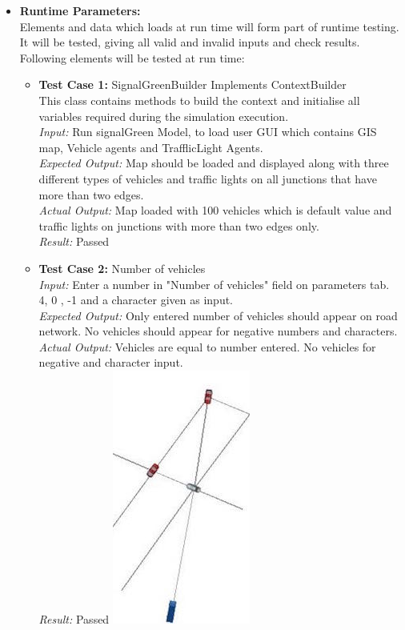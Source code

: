 \documentclass[11pt, oneside]{article}   	%
\begin{document}
\begin{itemize}
\begin{enumerate}
 \end{enumerate}
\item \textbf{Runtime Parameters:} \hfill \\
Elements and data which loads at run time will form part of runtime testing. It will be tested, giving all valid and invalid inputs and check results. Following elements will be tested at run time:
\begin{itemize}
\item \textbf{Test Case 1:} SignalGreenBuilder Implements ContextBuilder\hfill \\
This class contains methods to build the context and initialise all variables required during the simulation execution.\hfil \\
\textit{Input:} Run signalGreen Model, to load user GUI which contains GIS map, Vehicle agents and TrafflicLight Agents.\hfill \\
\textit{Expected Output:} Map should be loaded and displayed along with three different types of vehicles and traffic lights on all junctions that have more than two edges.\hfill \\
\textit{Actual Output:} Map loaded with 100 vehicles which is default value and traffic lights on junctions with more than two edges only.\hfill \\
\textit{Result:} Passed
\item\textbf{Test Case 2:} Number of vehicles\hfill \\
\textit{Input:} Enter a number in "Number of vehicles" field on parameters tab.\hfill \\
4, 0 , -1 and a character given as input.\hfill \\
\textit{Expected Output:} Only entered number of vehicles should appear on road network. No vehicles should appear for negative numbers and characters. \hfill \\
\textit{Actual Output:}  Vehicles are equal to number entered. No vehicles for negative and character input.\hfil \\
\textit{Result:} Passed
\includegraphics{4cars}\hfill \\

\end{itemize}
\end{itemize}
\end{document}
